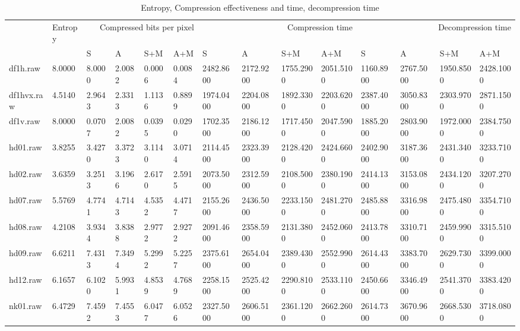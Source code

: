 \begin{table}
\caption{Entropy, Compression effectiveness and time, decompression time}
\begin{tabular}{llllllllllllll}
 & Entropy & \multicolumn{4}{r}{Compressed bits per pixel} & \multicolumn{4}{r}{Compression time} & \multicolumn{4}{r}{Decompression time} \\
 &  & S & A & S+M & A+M & S & A & S+M & A+M & S & A & S+M & A+M \\
df1h.raw & 8.0000 & 8.0000 & 2.0082 & 0.0006 & 0.0084 & 2482.8600 & 2172.9200 & 1755.2900 & 2051.5100 & 1160.8900 & 2767.5000 & 1950.8500 & 2428.1000 \\
df1hvx.raw & 4.5140 & 2.9643 & 2.3313 & 1.1136 & 0.8899 & 1974.0400 & 2204.0800 & 1892.3300 & 2203.6200 & 2387.4000 & 3050.8300 & 2303.9700 & 2871.1500 \\
df1v.raw & 8.0000 & 0.0707 & 2.0082 & 0.0395 & 0.0290 & 1702.3500 & 2186.1200 & 1717.4500 & 2047.5900 & 1885.2000 & 2803.9000 & 1972.0000 & 2384.7500 \\
hd01.raw & 3.8255 & 3.4270 & 3.3723 & 3.1140 & 3.0714 & 2114.4500 & 2323.3900 & 2128.4200 & 2424.6600 & 2402.9000 & 3187.3600 & 2431.3400 & 3233.7100 \\
hd02.raw & 3.6359 & 3.2513 & 3.1966 & 2.6170 & 2.5915 & 2073.5000 & 2312.5900 & 2108.5000 & 2380.1900 & 2414.1300 & 3153.0800 & 2434.1200 & 3207.2700 \\
hd07.raw & 5.5769 & 4.7741 & 4.7143 & 4.5352 & 4.4717 & 2155.2600 & 2436.5000 & 2233.1500 & 2481.2700 & 2485.8800 & 3316.9800 & 2475.4800 & 3354.7100 \\
hd08.raw & 4.2108 & 3.9344 & 3.8388 & 2.9772 & 2.9272 & 2091.4600 & 2358.5900 & 2131.3800 & 2452.0600 & 2413.7800 & 3310.7100 & 2459.9900 & 3315.5100 \\
hd09.raw & 6.6211 & 7.4313 & 7.3494 & 5.2992 & 5.2257 & 2375.6100 & 2654.0400 & 2389.4300 & 2552.9900 & 2614.4300 & 3383.7000 & 2629.7300 & 3399.0000 \\
hd12.raw & 6.1657 & 6.1020 & 5.9931 & 4.8539 & 4.7689 & 2258.1500 & 2525.4200 & 2290.8100 & 2533.1100 & 2450.6600 & 3346.4900 & 2541.3700 & 3383.4200 \\
nk01.raw & 6.4729 & 7.4592 & 7.4553 & 6.0477 & 6.0526 & 2327.5000 & 2606.5100 & 2361.1200 & 2662.2600 & 2614.7300 & 3670.9600 & 2668.5300 & 3718.0800 \\
\end{tabular}
\end{table}
